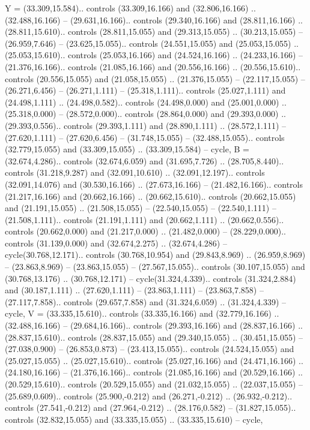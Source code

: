 {Y} = {(33.309,15.584).. controls (33.309,16.166) and (32.806,16.166) .. (32.488,16.166) -- (29.631,16.166).. controls (29.340,16.166) and (28.811,16.166) .. (28.811,15.610).. controls (28.811,15.055) and (29.313,15.055) .. (30.213,15.055) -- (26.959,7.646) -- (23.625,15.055).. controls (24.551,15.055) and (25.053,15.055) .. (25.053,15.610).. controls (25.053,16.166) and (24.524,16.166) .. (24.233,16.166) -- (21.376,16.166).. controls (21.085,16.166) and (20.556,16.166) .. (20.556,15.610).. controls (20.556,15.055) and (21.058,15.055) .. (21.376,15.055) -- (22.117,15.055) -- (26.271,6.456) -- (26.271,1.111) -- (25.318,1.111).. controls (25.027,1.111) and (24.498,1.111) .. (24.498,0.582).. controls (24.498,0.000) and (25.001,0.000) .. (25.318,0.000) -- (28.572,0.000).. controls (28.864,0.000) and (29.393,0.000) .. (29.393,0.556).. controls (29.393,1.111) and (28.890,1.111) .. (28.572,1.111) -- (27.620,1.111) -- (27.620,6.456) -- (31.748,15.055) -- (32.488,15.055).. controls (32.779,15.055) and (33.309,15.055) .. (33.309,15.584) -- cycle},
{B} = {(32.674,4.286).. controls (32.674,6.059) and (31.695,7.726) .. (28.705,8.440).. controls (31.218,9.287) and (32.091,10.610) .. (32.091,12.197).. controls (32.091,14.076) and (30.530,16.166) .. (27.673,16.166) -- (21.482,16.166).. controls (21.217,16.166) and (20.662,16.166) .. (20.662,15.610).. controls (20.662,15.055) and (21.191,15.055) .. (21.508,15.055) -- (22.540,15.055) -- (22.540,1.111) -- (21.508,1.111).. controls (21.191,1.111) and (20.662,1.111) .. (20.662,0.556).. controls (20.662,0.000) and (21.217,0.000) .. (21.482,0.000) -- (28.229,0.000).. controls (31.139,0.000) and (32.674,2.275) .. (32.674,4.286) -- cycle(30.768,12.171).. controls (30.768,10.954) and (29.843,8.969) .. (26.959,8.969) -- (23.863,8.969) -- (23.863,15.055) -- (27.567,15.055).. controls (30.107,15.055) and (30.768,13.176) .. (30.768,12.171) -- cycle(31.324,4.339).. controls (31.324,2.884) and (30.187,1.111) .. (27.620,1.111) -- (23.863,1.111) -- (23.863,7.858) -- (27.117,7.858).. controls (29.657,7.858) and (31.324,6.059) .. (31.324,4.339) -- cycle},
{V} = {(33.335,15.610).. controls (33.335,16.166) and (32.779,16.166) .. (32.488,16.166) -- (29.684,16.166).. controls (29.393,16.166) and (28.837,16.166) .. (28.837,15.610).. controls (28.837,15.055) and (29.340,15.055) .. (30.451,15.055) -- (27.038,0.900) -- (26.853,0.873) -- (23.413,15.055).. controls (24.524,15.055) and (25.027,15.055) .. (25.027,15.610).. controls (25.027,16.166) and (24.471,16.166) .. (24.180,16.166) -- (21.376,16.166).. controls (21.085,16.166) and (20.529,16.166) .. (20.529,15.610).. controls (20.529,15.055) and (21.032,15.055) .. (22.037,15.055) -- (25.689,0.609).. controls (25.900,-0.212) and (26.271,-0.212) .. (26.932,-0.212).. controls (27.541,-0.212) and (27.964,-0.212) .. (28.176,0.582) -- (31.827,15.055).. controls (32.832,15.055) and (33.335,15.055) .. (33.335,15.610) -- cycle},
